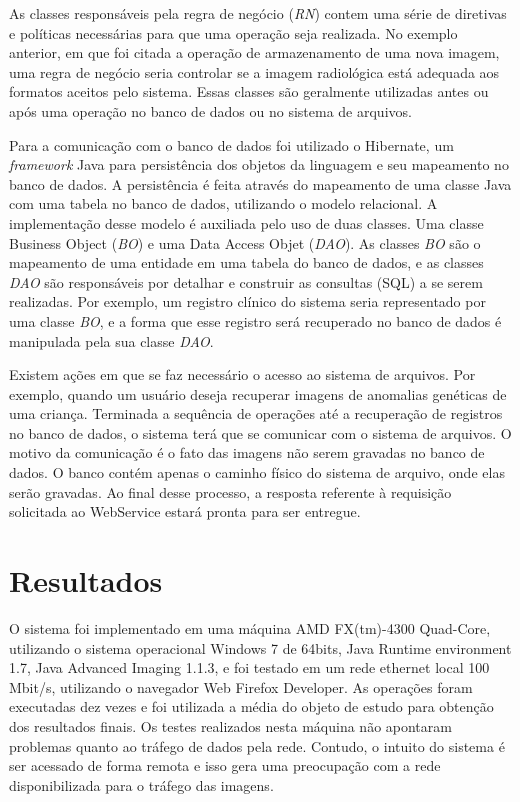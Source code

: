 As classes responsáveis pela regra de negócio (\textit{RN}) contem uma série de diretivas e políticas necessárias para que uma operação seja realizada.
No exemplo anterior, em que foi citada a operação de armazenamento de uma nova imagem, uma regra de negócio seria controlar se a imagem radiológica está adequada aos formatos aceitos pelo sistema.
Essas classes são geralmente utilizadas antes ou após uma operação no banco de dados ou no sistema de arquivos.

Para a comunicação com o banco de dados foi utilizado o Hibernate, um \textit{framework} Java para persistência dos objetos da linguagem e seu mapeamento no banco de dados.
A persistência é feita através do mapeamento de uma classe Java com uma tabela no banco de dados, utilizando o modelo relacional.
A implementação desse modelo é auxiliada pelo uso de duas classes. Uma classe Business Object (\textit{BO}) e uma Data Access Objet (\textit{DAO}).
As classes \textit{BO} são o mapeamento de uma entidade em uma tabela do banco de dados, e as classes \textit{DAO} são responsáveis por detalhar e construir as consultas (SQL) a se serem realizadas.
Por exemplo, um registro clínico do sistema seria representado por uma classe \textit{BO}, e a forma que esse registro será recuperado no banco de dados é manipulada pela sua classe \textit{DAO}.

Existem ações em que se faz necessário o acesso ao sistema de arquivos.
Por exemplo, quando um usuário deseja recuperar imagens de anomalias genéticas de uma criança.
Terminada a sequência de operações até a recuperação de registros no banco de dados, o sistema terá que se comunicar com o sistema de arquivos.
O motivo da comunicação é o fato das imagens não serem gravadas no banco de dados. O banco contém apenas o caminho físico do sistema de arquivo, onde elas serão gravadas.
Ao final desse processo, a resposta referente à requisição solicitada ao WebService estará pronta para ser entregue.

\section{\esp Resultados}

O sistema foi implementado em uma máquina AMD FX(tm)-4300 Quad-Core, utilizando o sistema operacional Windows 7 de 64bits, Java Runtime environment 1.7, Java Advanced Imaging 1.1.3, e foi testado em um rede ethernet local 100 Mbit/s, utilizando o navegador Web Firefox Developer. As operações foram executadas dez vezes e foi utilizada a média do objeto de estudo para obtenção dos resultados finais. Os testes realizados nesta máquina não apontaram problemas quanto ao tráfego de dados pela rede. Contudo, o intuito do sistema é ser acessado de forma remota e isso gera uma preocupação com a rede disponibilizada para o tráfego das imagens.

